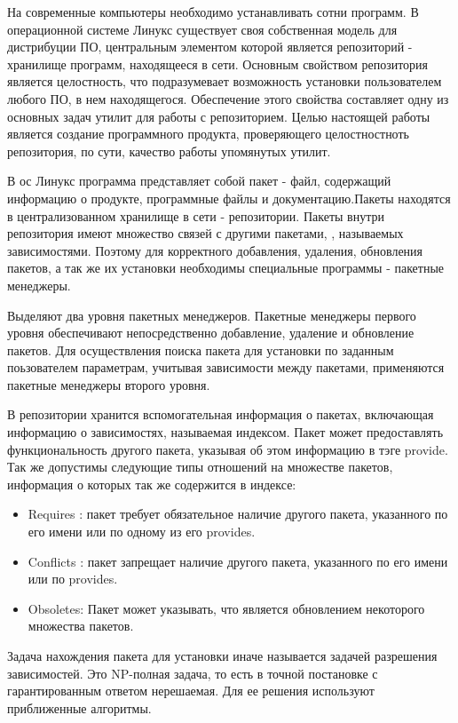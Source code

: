 \documentclass[a4paper]{article}
\begin{document}


На современные компьютеры необходимо устанавливать сотни программ. В операционной системе Линукс существует своя собственная модель для дистрибуции ПО, центральным элементом которой является репозиторий - хранилище программ, находящееся в сети. Основным свойством репозитория является целостность, что подразумевает возможность установки пользователем любого ПО, в нем находящегося. Обеспечение этого свойства составляет одну из основных задач утилит для работы с репозиторием. Целью настоящей работы является создание программного продукта, проверяющего целостностноть репозитория, по сути, качество работы упомянутых утилит.

В ос Линукс программа представляет собой пакет - файл, содержащий информацию о продукте, программные файлы и документацию.Пакеты находятся в централизованном хранилище в сети - репозитории. Пакеты внутри репозитория имеют множество связей с другими пакетами, , называемых зависимостями. Поэтому для корректного добавления, удаления, обновления пакетов, а так же их установки необходимы специальные программы - пакетные менеджеры.


Выделяют два уровня пакетных менеджеров. Пакетные менеджеры первого уровня обеспечивают непосредственно добавление, удаление и обновление пакетов. Для осуществления поиска пакета для установки по заданным поьзователем параметрам, учитывая зависимости между пакетами, применяются пакетные менеджеры второго уровня. 

 В репозитории хранится вспомогательная информация о пакетах, включающая информацию о зависимостях, называемая индексом.
Пакет может предоставлять функциональность другого пакета, указывая об этом информацию в тэге provide. 
Так же допустимы следующие типы отношений на множестве пакетов, информация о которых так же содержится в индексе:
\begin{itemize}
\item
Requires : пакет требует обязательное наличие другого пакета, указанного по его имени или по одному из его provides.
\item
Conflicts :
пакет запрещает наличие другого пакета, указанного по его имени или по
provides.
\item 
Obsoletes: Пакет может указывать, что является обновлением некоторого множества пакетов. 
\end{itemize}

Задача нахождения пакета для установки иначе называется задачей разрешения зависимостей. Это NP-полная задача,  то есть в точной постановке с гарантированным ответом нерешаемая. Для ее решения 
используют приближенные алгоритмы.
\end{document}
